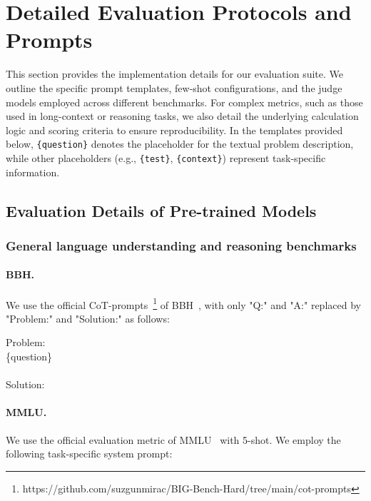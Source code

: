 

\section{Detailed Evaluation Protocols and Prompts}
\label{sec:post_training_eval_appendix}

This section provides the implementation details for our evaluation suite. We outline the specific prompt templates, few-shot configurations, and the judge models employed across different benchmarks. For complex metrics, such as those used in long-context or reasoning tasks, we also detail the underlying calculation logic and scoring criteria to ensure reproducibility. In the templates provided below, \texttt{\{question\}} denotes the placeholder for the textual problem description, while other placeholders (e.g., \texttt{\{test\}}, \texttt{\{context\}}) represent task-specific information.

\subsection{Evaluation Details of Pre-trained Models}

\subsubsection{General language understanding and reasoning benchmarks}

\paragraph{BBH.} We use the official CoT-prompts~\footnote{https://github.com/suzgunmirac/BIG-Bench-Hard/tree/main/cot-prompts} of BBH~\cite{suzgun2022challengingbbh}, with only "Q:" and "A:" replaced by "Problem:" and "Solution:" as follows:


\begin{MyBox}{}

    Problem:\\
    \{question\}\\
    \\
    Solution:\\
\end{MyBox}


\paragraph{MMLU.} We use the official evaluation metric of MMLU~\cite{hendrycks2020mmlu} with 5-shot. We employ the following task-specific system prompt:


